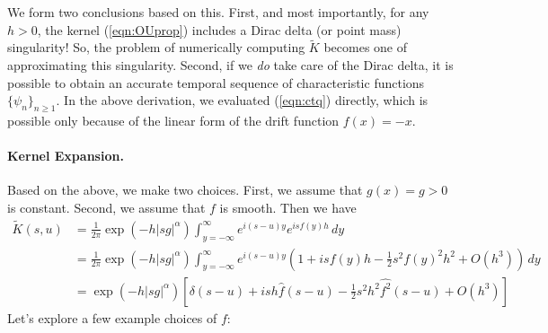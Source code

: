 \documentclass[11pt,letterpaper]{article}
\begin{document}
We form two conclusions based on this.  First, and most importantly, for any $h > 0$, the kernel (\ref{eqn:OUprop}) includes a Dirac delta (or point mass) singularity!  So, the problem of numerically computing $\widetilde{K}$ becomes one of approximating this singularity.  Second, if we \emph{do} take care of the Dirac delta, it is possible to obtain an accurate temporal sequence of characteristic functions $\{ \psi_n \}_{n \geq 1}$.  In the above derivation, we evaluated (\ref{eqn:ctq}) directly, which is possible only because of the linear form of the drift function $f(x) = -x$.

\paragraph{Kernel Expansion.} Based on the above, we make two choices.  First, we assume that $g(x) = g > 0$ is constant.  Second, we assume that $f$ is smooth.  Then we have
\begin{align}
\widetilde{K}(s,u) &= \frac{1}{2\pi} \exp{\left(  -h |s g|^{\alpha} \right)} \int_{y=-\infty}^{\infty}e^{i(s-u)y} e^{i s f(y) h} \, dy \nonumber \\
 &= \frac{1}{2\pi} \exp{\left(  -h |s g|^{\alpha} \right)} \int_{y=-\infty}^\infty e^{i(s-u) y} (1 + i s f(y) h - \frac{1}{2} s^2 f(y)^2 h^2 + O(h^3) ) \, dy \nonumber \\
 \label{eqn:kernelexpan}
 &= \exp{\left(  -h |s g|^{\alpha} \right)} \left[ \delta(s-u) + i s h \widehat{f}(s-u) - \frac{1}{2} s^2 h^2 \widehat{f^2}(s-u) + O(h^3) \right]
 \end{align}
Let's explore a few example choices of $f$:
\end{document}
